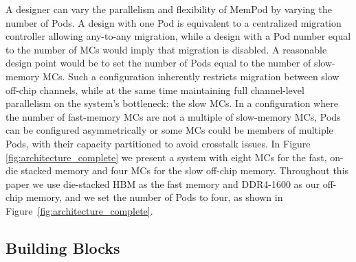 A designer can vary the parallelism and flexibility of MemPod by varying the
number of Pods. A design with one Pod is equivalent to a centralized 
migration controller allowing any-to-any migration,
while a design with a Pod number equal to the number of MCs would imply that migration is disabled. A reasonable design point would be to set the number of Pods equal to the number of slow-memory MCs. Such a configuration inherently restricts migration between slow off-chip channels, while at the same time maintaining full channel-level parallelism on the system's bottleneck: the slow MCs. In a configuration where the number of fast-memory MCs are not a multiple of slow-memory MCs, Pods can be configured asymmetrically or some MCs could be members of multiple Pods, with their capacity partitioned to avoid crosstalk issues. In Figure \ref{fig:architecture_complete} we present a system with eight MCs for the fast, on-die stacked memory and four MCs for the slow off-chip memory. Throughout this paper we use die-stacked HBM as the fast memory \cite{JEDEC-HBM-REVISED} and DDR4-1600 as our off-chip memory, and 
we set the number of Pods to four, as shown in Figure~\ref{fig:architecture_complete}.

\subsection{Building Blocks}

